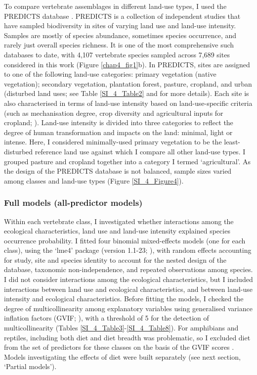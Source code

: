 To compare vertebrate assemblages in different land-use types, I used the PREDICTS database \citep{Hudson2014, Hudson2017}. PREDICTS is a collection of independent studies that have sampled biodiversity in sites of varying land use and land-use intensity. Samples are mostly of species abundance, sometimes species occurrence, and rarely just overall species richness. It is one of the most comprehensive such databases to date, with 4,107 vertebrate species sampled across 7,689 sites considered in this work (Figure \ref{chap4_fig1}b). In PREDICTS, sites are assigned to one of the following land-use categories: primary vegetation (native vegetation); secondary vegetation, plantation forest, pasture, cropland, and urban (disturbed land uses; see Table \ref{SI_4_Table2} and \citet{Hudson2014, Hudson2017} for more details). Each site is also characterised in terms of land-use intensity based on land-use-specific criteria (such as mechanisation degree, crop diversity and agricultural inputs for cropland; \citet{Hudson2014}). Land-use intensity is divided into three categories to reflect the degree of human transformation and impacts on the land: minimal, light or intense. Here, I considered minimally-used primary vegetation to be the least-disturbed reference land use against which I compare all other land-use types. I grouped pasture and cropland together into a category I termed `agricultural'. As the design of the PREDICTS database is not balanced, sample sizes varied among classes and land-use types (Figure \ref{SI_4_Figure4}).

\subsubsection{Full models (all-predictor models)}

Within each vertebrate class, I investigated whether interactions among the ecological characteristics, land use and land-use intensity explained species occurrence probability. I fitted four binomial mixed-effects models (one for each class), using the `lme4' package (version 1.1-23; \citet{Bates2015}), with random effects accounting for study, site and species identity to account for the nested design of the database, taxonomic non-independence, and repeated observations among species. I did not consider interactions among the ecological characteristics, but I included interactions between land use and ecological characteristics, and between land-use intensity and ecological characteristics. Before fitting the models, I checked the degree of multicollinearity among explanatory variables using generalised variance inflation factors (GVIF; \citet{Fox1992}), with a threshold of 5 for the detection of multicollinearity (Tables \ref{SI_4_Table3}-\ref{SI_4_Table8}). For amphibians and reptiles, including both diet and diet breadth was problematic, so I excluded diet from the set of predictors for these classes on the basis of the GVIF scores . Models investigating the effects of diet were built separately (see next section, `Partial models').

